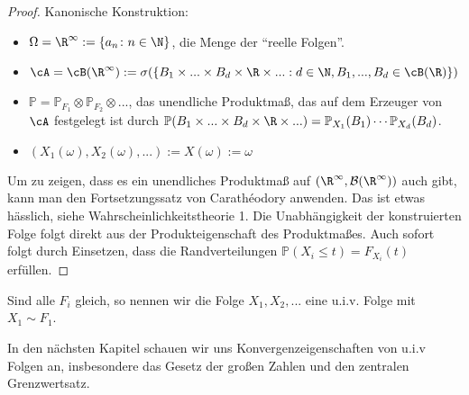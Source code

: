 \begin{proof}
	Kanonische Konstruktion:
\begin{itemize}
\item $\Omega = \R^{\infty} := \{ a_n\colon n \in \N \}$, die Menge der \enquote{reelle Folgen}.
\item $\cA = \cB(\R^{\infty}) := \sigma(\{B_1\times ... \times B_d \times \R \times ... : d\in \N, B_1, ..., B_d \in \cB(\R) \})$
\item $\mathbb{P} = \mathbb{P}_{F_1} \otimes \mathbb{P}_{F_2} \otimes ...$, das unendliche Produktma\ss, das auf dem Erzeuger von $\cA$ festgelegt ist durch $\mathbb P(B_1 \times ... \times B_d \times \R\times ...)=\mathbb P_{X_1}(B_1) \cdots \mathbb P_{X_d}(B_d)$.
\item $(X_1(\omega), X_2(\omega), ... ):=X(\omega):=\omega$
\end{itemize}
Um zu zeigen, dass es ein unendliches Produktma\ss{} auf $(\R^\infty, \mathcal B(\R^\infty))$ auch gibt, kann man den Fortsetzungssatz von Carath\'eodory anwenden. Das ist etwas h\"asslich, siehe Wahrscheinlichkeitstheorie 1. Die Unabh\"angigkeit der konstruierten Folge folgt direkt aus der Produkteigenschaft des Produktma\ss es. Auch sofort folgt durch Einsetzen, dass die Randverteilungen $\mathbb P(X_i\leq t)=F_{X_i}(t)$ erf\"ullen.
\end{proof}

\begin{deff}
	Sind alle $F_i$ gleich, so nennen wir die Folge $X_1,X_2,...$ eine u.i.v. Folge mit $X_1 \sim F_1$.
\end{deff}
In den n\"achsten Kapitel schauen wir uns Konvergenzeigenschaften von u.i.v Folgen an, insbesondere das Gesetz der gro\ss en Zahlen und den zentralen Grenzwertsatz.

